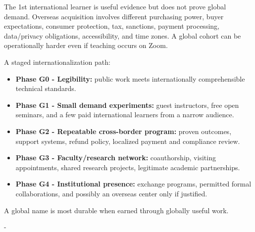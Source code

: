 The 1st international learner is useful evidence but does not prove global demand. Overseas acquisition involves different purchasing power, buyer expectations, consumer protection, tax, sanctions, payment processing, data/\allowbreak privacy obligations, accessibility, and time zones. A global cohort can be operationally harder even if teaching occurs on Zoom.

A staged internationalization path:

\begin{itemize}[leftmargin=*,itemsep=1.5pt]
  \item \textbf{Phase G0 - Legibility:} public work meets internationally comprehensible technical standards.
  \item \textbf{Phase G1 - Small demand experiments:} guest instructors, free open seminars, and a few paid international learners from a narrow audience.
  \item \textbf{Phase G2 - Repeatable cross-border program:} proven outcomes, support systems, refund policy, localized payment and compliance review.
  \item \textbf{Phase G3 - Faculty/\allowbreak research network:} coauthorship, visiting appointments, shared research projects, legitimate academic partnerships.
  \item \textbf{Phase G4 - Institutional presence:} exchange programs, permitted formal collaborations, and possibly an overseas center only if justified.
\end{itemize}

A global name is most durable when earned through globally useful work.

-


